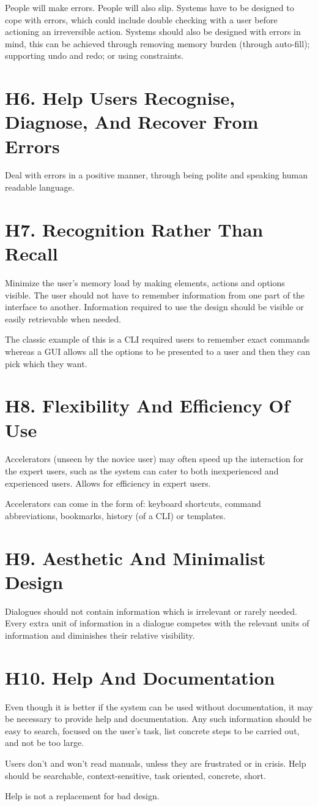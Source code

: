 People will make errors. People will also slip. Systems have to be designed to cope with errors, which could include double checking with a user before actioning an irreversible action. Systems should also be designed with errors in mind, this can be achieved through removing memory burden (through auto-fill); supporting undo and redo; or using constraints. 

\section*{H6. Help Users Recognise, Diagnose, And Recover From Errors}
Deal with errors in a positive manner, through being polite and speaking human readable language. 

\section*{H7. Recognition Rather Than Recall}
Minimize the user's memory load by making elements, actions and options visible. The user should not have to remember information from one part of the interface to another. Information required to use the design should be visible or easily retrievable when needed. 

The classic example of this is a CLI required users to remember exact commands whereas a GUI allows all the options to be presented to a user and then they can pick which they want.

\section*{H8. Flexibility And Efficiency Of Use}
Accelerators (unseen by the novice user) may often speed up the interaction for the expert users, such as the system can cater to both inexperienced and experienced users. Allows for efficiency in expert users.

Accelerators can come in the form of: keyboard shortcuts, command abbreviations, bookmarks, history (of a CLI) or templates. 

\section*{H9. Aesthetic And Minimalist Design}
Dialogues should not contain information which is irrelevant or rarely needed. Every extra unit of information in a dialogue competes with the relevant units of information and diminishes their relative visibility.

\section*{H10. Help And Documentation}
Even though it is better if the system can be used without documentation, it may be necessary to provide help and documentation. Any such information should be easy to search, focused on the user's task, list concrete steps to be carried out, and not be too large.

Users don't and won't read manuals, unless they are frustrated or in crisis. Help should be searchable, context-sensitive, task oriented, concrete, short. 

Help is not a replacement for bad design. 